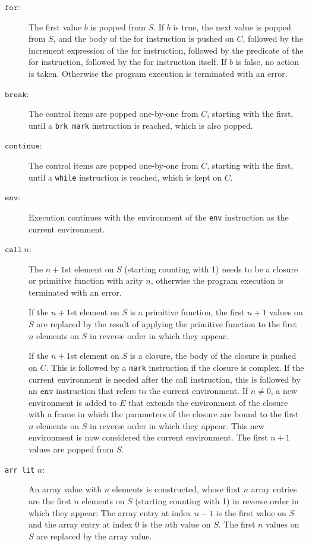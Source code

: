 \begin{description}
\item[$\texttt{for}$:]
The first value $b$ is popped from $S$. If $b$ is true,
the next value is popped from $S$, and the body of the
for instruction is pushed on $C$,
followed by the increment expression
of the for instruction, 
followed by the predicate
of the for instruction, followed by the for instruction itself.
If $b$ is false, no action is taken.
Otherwise the program
execution is terminated with an error.

\item[$\texttt{break}$:]
The control items are popped one-by-one from $C$, starting with the first, until
a \texttt{brk mark} instruction is reached, which is also popped.

\item[$\texttt{continue}$:]
The control items are popped one-by-one from $C$, starting with the first, until
a \texttt{while} instruction is reached, which is kept on $C$.

\item[$\texttt{env}$:]
Execution continues with the environment of the \texttt{env} instruction as
the current environment.

\item[$\texttt{call}\ n$:]
The $n + 1$st element on $S$ (starting counting with 1) needs to be a closure
or primitive function with arity $n$, otherwise the program
execution is terminated with an error.

If the $n + 1$st element on $S$ is a primitive function,
the first $n + 1$ values on $S$ are replaced by the result of applying the primitive
function to the first $n$ elements on $S$ in reverse order in which they appear.

If the $n + 1$st element on $S$ is a closure, 
the body of the closure is pushed on $C$.
This is followed by a \texttt{mark} instruction if the closure is complex.
If the current environment is needed after the call instruction, this
is followed by an $\texttt{env}$ instruction that refers to the current environment.
If $n \neq 0$, a new environment is added to $E$
that extends the environment of the closure with a frame in which the
parameters of the closure are bound to the first $n$ elements on $S$
in reverse order in which they appear.
This new environment is now considered the current environment.
The first $n + 1$ values are popped from $S$.

\item[\texttt{arr lit} $n$:]
An array value with $n$ elements is constructed, whose first $n$ array entries
are the first $n$ elements on $S$
(starting counting with 1) in reverse order in which they appear: The array entry
at index $n - 1$ is the first value on $S$ and the array entry
at index $0$ is the $n$th value on $S$. The first $n$ values on $S$ are replaced
by the array value.


\end{description}
